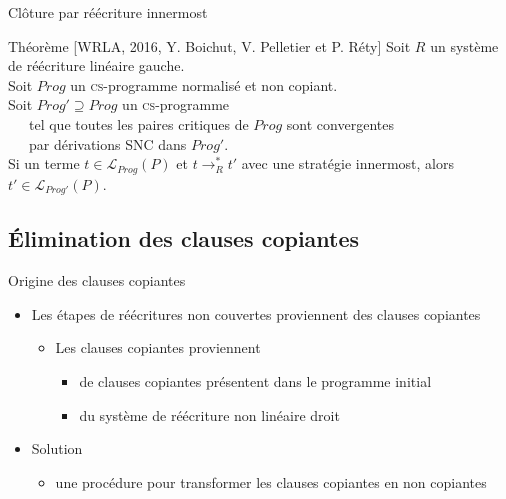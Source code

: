 \documentclass[xcolor={dvipsnames}]{beamer}
\newcommand{\csprogramme}{\textsc{cs}-programme\xspace}
\begin{document}
\begin{frame}{Clôture par réécriture innermost}
  \begin{alertblock}{Théorème [WRLA, 2016, Y. Boichut, V. Pelletier et P. Réty]}
    Soit $R$ un système de réécriture linéaire gauche.\\
    \pause
    Soit $Prog$ un \csprogramme normalisé et non copiant.\\
    \pause
    Soit $Prog' \supseteq Prog$ un \csprogramme \\
    \pause
    ~~~tel que toutes les paires critiques de $Prog$ sont convergentes\\
    ~~~par dérivations SNC dans $Prog'$.\\
    \pause
    Si un terme $t \in \mathcal{L}_{Prog}(P)$ et $t \rightarrow^*_R t'$ avec une stratégie innermost, alors $t' \in \mathcal L_{Prog'}(P)$.
  \end{alertblock}
\end{frame}


\subsection{Élimination des clauses copiantes}

\begin{frame}{Origine des clauses copiantes}
  \begin{itemize}[<+->]
  \item Les étapes de réécritures non couvertes proviennent des clauses copiantes
    \begin{itemize}
    \item Les clauses copiantes proviennent
      \begin{itemize}
      \item de clauses copiantes présentent dans le programme initial
      \item du système de réécriture non linéaire droit
      \end{itemize}
    \end{itemize}
    \vspace{\baselineskip}
  \item Solution
    \begin{itemize}
    \item une procédure pour transformer les clauses copiantes en non copiantes
    \end{itemize}
  \end{itemize}
\end{frame}
\end{document}
